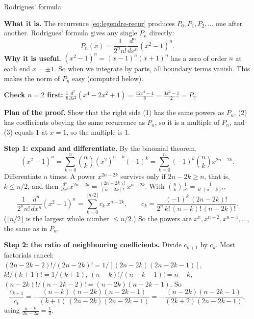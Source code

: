 \documentclass[11pt]{beamer}
\begin{document}
\begin{frame}[allowframebreaks=1.00]{Rodrigues' formula}
\footnotesize

\textbf{What it is.} The recurrence \eqref{eq:legendre-recur} produces \(P_0,P_1,P_2,\dots\) one after another.
Rodrigues' formula gives any single \(P_n\) directly:
\begin{equation}
 P_n(x)=\frac{1}{2^n n!}\frac{d^n}{dx^n}(x^2-1)^n.
 \label{eq:rodrigues-legendre}
\end{equation}
\textbf{Why it is useful.} \((x^2-1)^n=(x-1)^n(x+1)^n\) has a zero of order \(n\) at each end \(x=\pm1\). So when we
integrate by parts, all boundary terms vanish. This makes the norm of \(P_n\) easy (computed below).

\textbf{Check \(n=2\) first:} \(\frac1{8}\frac{d^2}{dx^2}(x^4-2x^2+1)=\frac{12x^2-4}{8}=\frac{3x^2-1}{2}=P_2\). \checkmark

\textbf{Plan of the proof.} Show that the right side (1) has the same powers as \(P_n\), (2) has
coefficients obeying the same recurrence as \(P_n\), so it is a multiple of \(P_n\), and (3) equals \(1\) at
\(x=1\), so the multiple is \(1\).
\par\framebreak\par
\textbf{Step 1: expand and differentiate.} By the binomial theorem,
\[
 (x^2-1)^n=\sum_{k=0}^{n}\binom nk (x^2)^{n-k}(-1)^k=\sum_{k=0}^{n}(-1)^k\binom nk x^{2n-2k}.
\]
Differentiate \(n\) times. A power \(x^{2n-2k}\) survives only if \(2n-2k\ge n\), that is,
\(k\le n/2\), and then \(\frac{d^n}{dx^n}x^{2n-2k}=\frac{(2n-2k)!}{(n-2k)!}\,x^{n-2k}\). With
\(\binom nk\frac1{n!}=\frac{1}{k!\,(n-k)!}\),
\[
 \frac{1}{2^n n!}\frac{d^n}{dx^n}(x^2-1)^n
 =\sum_{k=0}^{\lfloor n/2\rfloor}
   c_k\,x^{n-2k},
 \qquad
 c_k=\frac{(-1)^k\,(2n-2k)!}{2^n\, k!\,(n-k)!\,(n-2k)!}.
\]
(\(\lfloor n/2\rfloor\) is the largest whole number \(\le n/2\).) So the powers are \(x^n,x^{n-2},x^{n-4},\dots\), the same
as in \(P_n\).
\par\framebreak\par
\textbf{Step 2: the ratio of neighbouring coefficients.} Divide \(c_{k+1}\) by \(c_k\). Most factorials cancel:
\((2n-2k-2)!/(2n-2k)!=1/[(2n-2k)(2n-2k-1)]\), \(k!/(k+1)!=1/(k+1)\),
\((n-k)!/(n-k-1)!=n-k\), \((n-2k)!/(n-2k-2)!=(n-2k)(n-2k-1)\). So
\[
 \frac{c_{k+1}}{c_k}
 =-\frac{(n-k)\,(n-2k)(n-2k-1)}{(k+1)\,(2n-2k)(2n-2k-1)}
 =-\frac{(n-2k)(n-2k-1)}{(2k+2)(2n-2k-1)},
\]
using \(\frac{n-k}{2n-2k}=\frac12\).


\end{frame}
\end{document}
